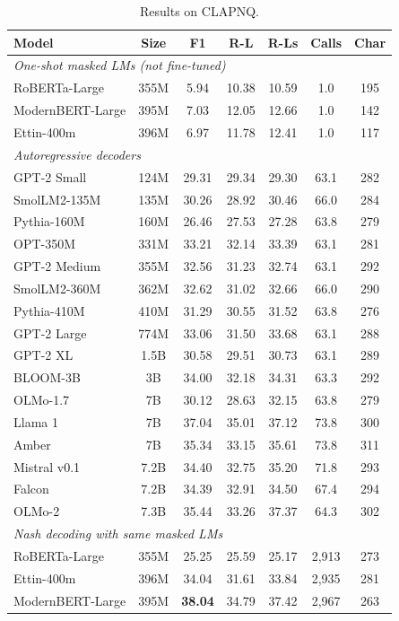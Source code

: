\begin{table}[t]
\centering
\begin{tabular}{lcccccc}
\toprule
\textbf{Model} & \textbf{Size} & \textbf{F1} & \textbf{R-L} & \textbf{R-Ls} & \textbf{Calls} & \textbf{Char} \\
\midrule
\multicolumn{7}{l}{\textit{One-shot masked LMs (not fine-tuned)}} \\
RoBERTa-Large & 355M & 5.94 & 10.38 & 10.59 & 1.0 & 195 \\
ModernBERT-Large & 395M & 7.03 & 12.05 & 12.66 & 1.0 & 142 \\
Ettin-400m & 396M & 6.97 & 11.78 & 12.41 & 1.0 & 117 \\
\midrule
\multicolumn{7}{l}{\textit{Autoregressive decoders}} \\
GPT-2 Small & 124M & 29.31 & 29.34 & 29.30 & 63.1 & 282 \\
SmolLM2-135M & 135M & 30.26 & 28.92 & 30.46 & 66.0 & 284 \\
Pythia-160M & 160M & 26.46 & 27.53 & 27.28 & 63.8 & 279 \\
OPT-350M & 331M & 33.21 & 32.14 & 33.39 & 63.1 & 281 \\
GPT-2 Medium & 355M & 32.56 & 31.23 & 32.74 & 63.1 & 292 \\
SmolLM2-360M & 362M & 32.62 & 31.02 & 32.66 & 66.0 & 290 \\
Pythia-410M & 410M & 31.29 & 30.55 & 31.52 & 63.8 & 276 \\
GPT-2 Large & 774M & 33.06 & 31.50 & 33.68 & 63.1 & 288 \\
GPT-2 XL & 1.5B & 30.58 & 29.51 & 30.73 & 63.1 & 289 \\
BLOOM-3B & 3B & 34.00 & 32.18 & 34.31 & 63.3 & 292 \\
OLMo-1.7 & 7B & 30.12 & 28.63 & 32.15 & 63.8 & 279 \\
Llama 1 & 7B & 37.04 & 35.01 & 37.12 & 73.8 & 300 \\
Amber & 7B & 35.34 & 33.15 & 35.61 & 73.8 & 311 \\
Mistral v0.1 & 7.2B & 34.40 & 32.75 & 35.20 & 71.8 & 293 \\
Falcon & 7.2B & 34.39 & 32.91 & 34.50 & 67.4 & 294 \\
OLMo-2 & 7.3B & 35.44 & 33.26 & 37.37 & 64.3 & 302 \\
\midrule
\multicolumn{7}{l}{\textit{Nash decoding with same masked LMs}} \\
RoBERTa-Large & 355M & 25.25 & 25.59 & 25.17 & 2,913 & 273 \\
Ettin-400m & 396M & 34.04 & 31.61 & 33.84 & 2,935 & 281 \\
ModernBERT-Large & 395M & \textbf{38.04} & 34.79 & 37.42 & 2,967 & 263 \\
\bottomrule
\end{tabular}
\caption{Results on CLAPNQ.}
\label{tab:clapnq}
\end{table}
